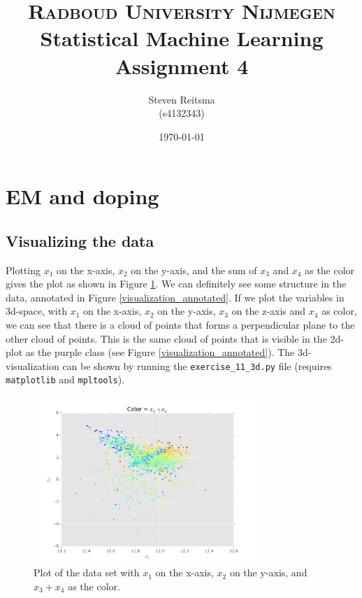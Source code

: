 \documentclass[paper=a4, fontsize=10pt]{scrartcl} %
\title{	
\normalfont \normalsize 
\textsc{Radboud University Nijmegen}  %
\horrule{0.5pt} \\[0.3cm] %
\huge Statistical Machine Learning \\ Assignment 4 \\ %
\horrule{2pt}  %
}
\author{Steven Reitsma \\ (s4132343)} %
\date{\normalsize\today} %
\numberwithin{equation}{section} %
\numberwithin{figure}{section} %
\numberwithin{table}{section} %
\begin{document}
\maketitle %

\section{EM and doping}
\subsection{Visualizing the data}
Plotting $x_1$ on the x-axis, $x_2$ on the y-axis, and the sum of $x_3$ and $x_4$ as the color gives the plot as shown in Figure \ref{visualization}. We can definitely see some structure in the data, annotated in Figure \ref{visualization_annotated}. If we plot the variables in 3d-space, with $x_1$ on the x-axis, $x_2$ on the y-axis, $x_3$ on the z-axis and $x_4$ as color, we can see that there is a cloud of points that forms a perpendicular plane to the other cloud of points. This is the same cloud of points that is visible in the 2d-plot as the purple class (see Figure \ref{visualization_annotated}). The 3d-visualization can be shown by running the \verb|exercise_11_3d.py| file (requires \verb|matplotlib| and \verb|mpltools|).

\begin{figure}[h!]
	\centering
	\includegraphics[width=0.75\textwidth]{exercise_11.pdf}
	\caption{Plot of the data set with $x_1$ on the x-axis, $x_2$ on the y-axis, and $x_3 + x_4$ as the color.}
	\label{visualization}
\end{figure}
\end{document}
